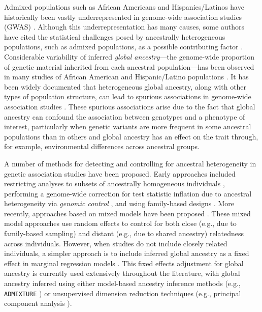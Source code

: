 \documentclass[12pt]{article}
\begin{document}
Admixed populations such as African Americans and Hispanics/Latinos have historically been vastly underrepresented in genome-wide association studies (GWAS) \cite{need2009, bustamante2011, popejoy2016, morales2018, sirugo2019, martin2019}. 
Although this underrepresentation has many causes, some authors have cited the statistical challenges posed by ancestrally heterogeneous populations, such as admixed populations, as a possible contributing factor \citep{need2009, bustamante2011, popejoy2016}. 
Considerable variability of inferred \textit{global ancestry}---the genome-wide proportion of genetic material inherited from each ancestral population---has been observed in many studies of African American and Hispanic/Latino populations \citep{parra1998, tishkoff2009, bryc2010aa, bryc2010hl, conomos2016}.
It has been widely documented that heterogeneous global ancestry, along with other types of population structure, can lead to spurious associations in genome-wide association studies \citep{GenomicControl, eigenstrat, marchini2004, price2010}. 
These spurious associations arise due to the fact that global ancestry can confound the association between genotypes and a phenotype of interest, particularly when genetic variants are more frequent in some ancestral populations than in others  and global ancestry has an effect on the trait through, for example, environmental differences across ancestral groups. 

A number of methods for detecting and controlling for ancestral heterogeneity in genetic association studies have been proposed. 
Early approaches included restricting analyses to subsets of ancestrally homogeneous individuals \citep{lander1994}, performing a genome-wide correction for test statistic inflation due to ancestral heterogeneity via \textit{genomic control} \citep{GenomicControl}, and using family-based designs \citep{tdt}. 
More recently, approaches based on mixed models have been proposed \citep{yu2006, kang2010, yang2014}. 
These mixed model approaches use random effects to control for both close (e.g., due to family-based sampling) and distant (e.g., due to shared ancestry) relatedness across individuals.
However, when studies do not include closely related individuals, a simpler approach is to include inferred global ancestry as a fixed effect in marginal regression models \citep{eigenstrat, pritchard2000}. 
This fixed effects adjustment for global ancestry is currently used extensively throughout the literature, with global ancestry inferred using either model-based ancestry inference methods (e.g., \texttt{ADMIXTURE} \citep{admixture}) or unsupervised dimension reduction techniques (e.g., principal component analysis \citep{eigenstrat}).
\end{document}
